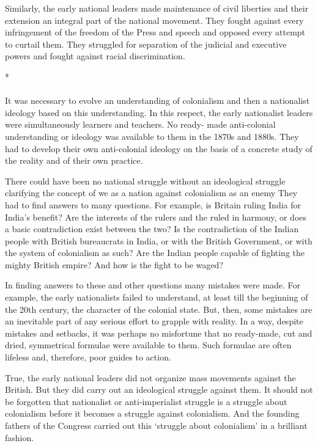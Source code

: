 Similarly, the early national leaders made maintenance of civil liberties and their extension an integral part of the national movement. They fought against every infringement of the freedom of the Press and speech and opposed every attempt to curtail them. They struggled for separation of the judicial and executive powers and fought against racial discrimination.

\begin{center}*\end{center}

\paragraph*{}

It was necessary to evolve an understanding of colonialism and then a nationalist ideology based on this understanding. In this respect, the early nationalist leaders were simultaneously learners and teachers. No ready- made anti-colonial understanding or ideology was available to them in the 1870s and 1880s. They had to develop their own anti-colonial ideology on the basis of a concrete study of the reality and of their own practice.

There could have been no national struggle without an ideological struggle clarifying the concept of we as a nation against colonialism as an enemy They had to find answers to many questions. For example, is Britain ruling India for India's benefit? Are the interests of the rulers and the ruled in harmony, or does a basic contradiction exist between the two? Is the contradiction of the Indian people with British bureaucrats in India, or with the British Government, or with the system of colonialism as such? Are the Indian people capable of fighting the mighty British empire? And how is the fight to be waged?

In finding answers to these and other questions many mistakes were made. For example, the early nationalists failed to understand, at least till the beginning of the 20th century, the character of the colonial state. But, then, some mistakes are an inevitable part of any serious effort to grapple with reality. In a way, despite mistakes and setbacks, it was perhaps no misfortune that no ready-made, cut and dried, symmetrical formulae were available to them. Such formulae are often lifeless and, therefore, poor guides to action.

True, the early national leaders did not organize mass movements against the British. But they did carry out an ideological struggle against them. It should not be forgotten that nationalist or anti-imperialist struggle is a struggle about colonialism before it becomes a struggle against colonialism. And the founding fathers of the Congress carried out this `struggle about colonialism' in a brilliant fashion.

